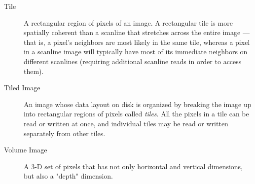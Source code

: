 \begin{description}
\item[Tile] A rectangular region of pixels of an image.  A rectangular
  tile is more spatially coherent than a scanline that stretches across
  the entire image --- that is, a pixel's neighbors are most likely in
  the same tile, whereas a pixel in a scanline image will typically have
  most of its immediate neighbors on different scanlines (requiring
  additional scanline reads in order to access them).

\item[Tiled Image] An image whose data layout on disk is organized by
  breaking the image up into rectangular regions of pixels called
  \emph{tiles}.  All the pixels in a tile can be read or written at
  once, and individual tiles may be read or written separately from
  other tiles.

\item[Volume Image] A 3-D set of pixels that has not only horizontal and
  vertical dimensions, but also a "depth" dimension.

\end{description}

\chapwidthend
